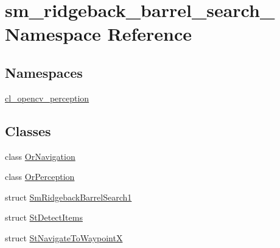 \hypertarget{namespacesm__ridgeback__barrel__search__1}{}\section{sm\+\_\+ridgeback\+\_\+barrel\+\_\+search\+\_ Namespace Reference}
\label{namespacesm__ridgeback__barrel__search__1}
\subsection*{Namespaces}
\begin{DoxyCompactItemize}
\item 
 \hyperlink{namespacesm__ridgeback__barrel__search__1_1_1cl__opencv__perception}{cl\+\_\+opencv\+\_\+perception}
\end{DoxyCompactItemize}
\subsection*{Classes}
\begin{DoxyCompactItemize}
\item 
class \hyperlink{classsm__ridgeback__barrel__search__1_1_1OrNavigation}{Or\+Navigation}
\item 
class \hyperlink{classsm__ridgeback__barrel__search__1_1_1OrPerception}{Or\+Perception}
\item 
struct \hyperlink{structsm__ridgeback__barrel__search__1_1_1SmRidgebackBarrelSearch1}{Sm\+Ridgeback\+Barrel\+Search1}
\item 
struct \hyperlink{structsm__ridgeback__barrel__search__1_1_1StDetectItems}{St\+Detect\+Items}
\item 
struct \hyperlink{structsm__ridgeback__barrel__search__1_1_1StNavigateToWaypointX}{St\+Navigate\+To\+WaypointX}
\end{DoxyCompactItemize}
